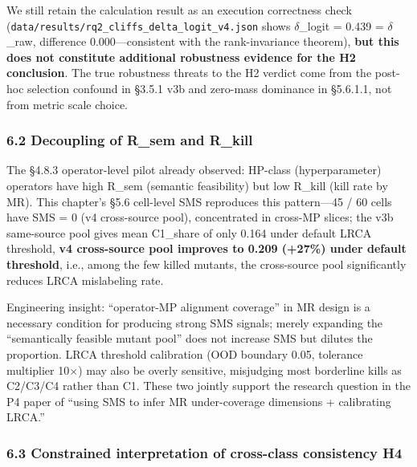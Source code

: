\documentclass[review,12pt,authoryear]{elsarticle}
\begin{document}
We still retain the calculation result as an execution correctness check
(\texttt{data/results/rq2\_cliffs\_delta\_logit\_v4.json} shows $\delta$\_logit
= 0.439 = $\delta$\_raw, difference 0.000---consistent with the rank-invariance
theorem), \textbf{but this does not constitute additional robustness
evidence for the H2 conclusion}. The true robustness threats to the H2
verdict come from the post-hoc selection confound in §3.5.1 v3b and
zero-mass dominance in §5.6.1.1, not from metric scale choice.

\subsubsection{6.2 Decoupling of R\_sem and
R\_kill}\label{decoupling-of-r_sem-and-r_kill}

The §4.8.3 operator-level pilot already observed: HP-class
(hyperparameter) operators have high R\_sem (semantic feasibility) but
low R\_kill (kill rate by MR). This chapter's §5.6 cell-level SMS
reproduces this pattern---45 / 60 cells have SMS = 0 (v4 cross-source
pool), concentrated in cross-MP slices; the v3b same-source pool gives
mean C1\_share of only 0.164 under default LRCA threshold, \textbf{v4
cross-source pool improves to 0.209 (+27\%) under default threshold},
i.e., among the few killed mutants, the cross-source pool significantly
reduces LRCA mislabeling rate.

Engineering insight: ``operator-MP alignment coverage'' in MR design is
a necessary condition for producing strong SMS signals; merely expanding
the ``semantically feasible mutant pool'' does not increase SMS but
dilutes the proportion. LRCA threshold calibration (OOD boundary 0.05,
tolerance multiplier 10$\times$) may also be overly sensitive, misjudging most
borderline kills as C2/C3/C4 rather than C1. These two jointly support
the research question in the P4 paper of ``using SMS to infer MR
under-coverage dimensions + calibrating LRCA.''

\subsubsection{6.3 Constrained interpretation of cross-class consistency
H4}\label{constrained-interpretation-of-cross-class-consistency-h4}
\end{document}
